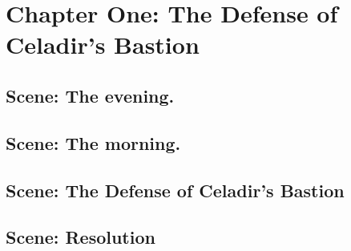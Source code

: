 \section{Chapter One: The Defense of Celadir's Bastion}\label{sec:chapterOne:TheDefenseOfCeladir'sBastion}
\subsection{Scene: The evening.}\label{subsec:scene:TheEvening.}
\subsection{Scene: The morning.}\label{subsec:scene:TheMorning.}
\subsection{Scene: The Defense of Celadir's Bastion}\label{subsec:scene:TheDefenseOfCeladir'sBastion}
\subsection{Scene: Resolution}\label{subsec:scene:Resolution}

